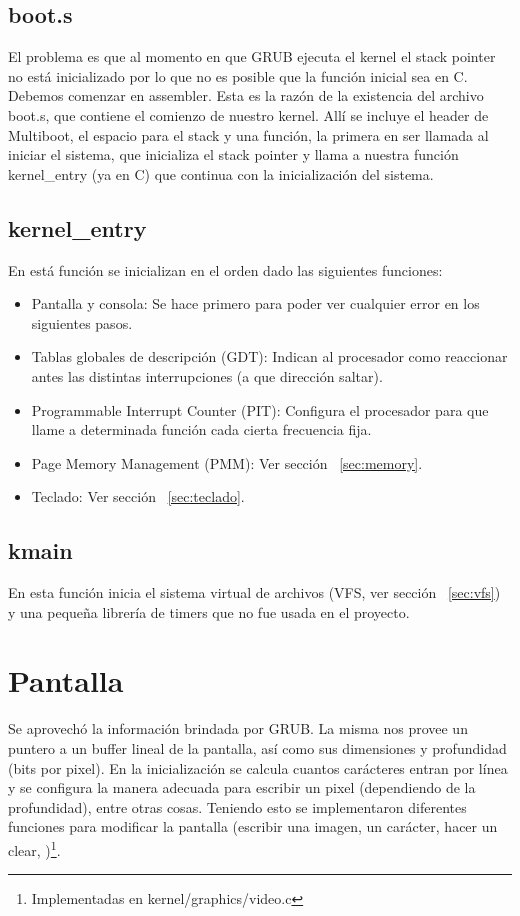 \subsection[boot.s]{boot.s\protect\footnotemark{}\protect{}}
El problema es que al momento en que GRUB ejecuta el kernel el stack pointer no está inicializado por lo que no es posible que la función inicial sea en C. Debemos comenzar en assembler. Esta es la razón de la existencia del archivo boot.s, que contiene el comienzo de nuestro kernel. Allí se incluye el header de Multiboot, el espacio para el stack y una función, la primera en ser llamada al iniciar el sistema, que inicializa el stack pointer y llama a nuestra función kernel\_entry (ya en C) que continua con la inicialización del sistema.

\subsection[kernel\_entry]{kernel\_entry\protect\footnotemark{}\protect{}}
En está función se inicializan en el orden dado las siguientes funciones:
\begin{itemize}
\item Pantalla y consola: Se hace primero para poder ver cualquier error en los siguientes pasos.
\item Tablas globales de descripción (GDT): Indican al procesador como reaccionar antes las distintas interrupciones (a que dirección saltar).
\item Programmable Interrupt Counter (PIT): Configura el procesador para que llame a determinada función cada cierta frecuencia fija.
\item Page Memory Management (PMM): Ver sección ~\ref{sec:memory}.
\item Teclado: Ver sección ~\ref{sec:teclado}.
\end{itemize}

\subsection[kmain]{kmain\protect\footnotemark{}\protect{}}
En esta función inicia el sistema virtual de archivos (VFS, ver sección ~\ref{sec:vfs}) y una pequeña librería de timers que no fue usada en el proyecto.


\section{Pantalla}\label{sec:pantalla}
Se aprovechó la información brindada por GRUB. La misma nos provee un puntero a un buffer lineal de la pantalla, así como sus dimensiones y profundidad (bits por pixel). En la inicialización se calcula cuantos carácteres entran por línea y se configura la manera adecuada para  escribir un pixel (dependiendo de la profundidad), entre otras cosas.
Teniendo esto se implementaron diferentes funciones para modificar la  pantalla (escribir una imagen, un carácter, hacer un clear, \etc)\footnote{Implementadas en kernel/graphics/video.c}.

